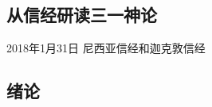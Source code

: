 \begin{appendices}
\chapter{从信经研读三一神论}
2018年1月31日 \hfill 尼西亚信经和迦克敦信经


\section{绪论}

\qquad

%
%
\end{appendices}